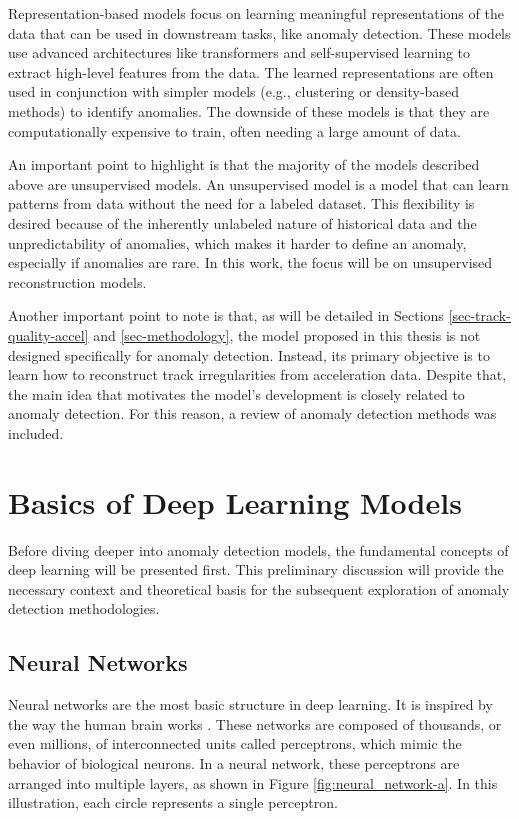 Representation-based models focus on learning meaningful representations of the data that can be used in downstream tasks, like anomaly detection.  These models use advanced architectures like transformers and self-supervised learning to extract high-level features from the data. The learned representations are often used in conjunction with simpler models (e.g., clustering or density-based methods) to identify anomalies. The downside of these models is that they are computationally expensive to train, often needing a large amount of data.

An important point to highlight is that the majority of the models described above are unsupervised models. An unsupervised model is a model that can learn patterns from data without the need for a labeled dataset. This flexibility is desired because of the inherently unlabeled nature of historical data and the unpredictability of anomalies, which makes it harder to define an anomaly, especially if anomalies are rare. In this work, the focus will be on unsupervised reconstruction models.

Another important point to note is that, as will be detailed in Sections \ref{sec-track-quality-accel} and \ref{sec-methodology}, the model proposed in this thesis is not designed specifically for anomaly detection. Instead, its primary objective is to learn how to reconstruct track irregularities from acceleration data. Despite that, the main idea that motivates the model's development is closely related to anomaly detection. For this reason, a review of anomaly detection methods was included.

\section{Basics of Deep Learning Models}

Before diving deeper into anomaly detection models, the fundamental concepts of deep learning will be presented first. This preliminary discussion will provide the necessary context and theoretical basis for the subsequent exploration of anomaly detection methodologies.

\subsection{Neural Networks} \label{sec-Neural_networks}

Neural networks are the most basic structure in deep learning. It is inspired by the way the human brain works \cite{AGATONOVICKUSTRIN2000717,Alzubaidi_Zhang_Humaidi_Al_Dujaili_Duan_Al_Shamma_Santamaria_Fadhel_Al_Amidie_Farhan_2021}. These networks are composed of thousands, or even millions, of interconnected units called perceptrons, which mimic the behavior of biological neurons. In a neural network, these perceptrons are arranged into multiple layers, as shown in Figure \ref{fig:neural_network-a}. In this illustration, each circle represents a single perceptron. 


